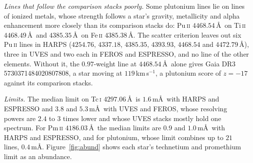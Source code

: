 \documentclass[3p,11pt]{elsarticle}
\newcommand{\kms}{km\,s$^{-1}$}
\newcommand{\ion}[2]{#1\,\textsc{#2}}
\begin{document}
\emph{Lines that follow the comparison stacks poorly.} Some plutonium lines lie on lines
of ionized metals, whose strength follows a star's gravity, metallicity and alpha
enhancement more closely than its comparison stacks do: \ion{Pu}{ii} $4468.54$\,\AA\ on
\ion{Ti}{ii} $4468.49$\,\AA\ and $4385.35$\,\AA\ on \ion{Fe}{ii} $4385.38$\,\AA. The
scatter criterion leaves out six \ion{Pu}{ii} lines in HARPS ($4254.76$, $4337.18$,
$4385.35$, $4393.93$, $4468.54$ and $4472.79$\,\AA), three in UVES and two each in
FEROS and ESPRESSO, and no line of the other elements. Without it, the $0.97$-weight
line at $4468.54$\,\AA\ alone gives Gaia DR3 5730371484020807808, a star moving at
$119$\,\kms, a plutonium score of $z=-17$ against its comparison stacks.

\emph{Limits.} The median limit on \ion{Tc}{i} $4297.06$\,\AA\ is $1.6$\,m\AA\ with
HARPS and ESPRESSO and $3.8$ and $5.3$\,m\AA\ with UVES and FEROS, whose resolving
powers are $2.4$ to $3$ times lower and whose UVES stacks mostly hold one spectrum. For
\ion{Pm}{ii} $4186.03$\,\AA\ the median limits are $0.9$ and $1.0$\,m\AA\ with HARPS and
ESPRESSO, and for plutonium, whose limit combines up to $21$ lines, $0.4$\,m\AA.
Figure~\ref{fig:abund} shows each star's technetium and promethium limit as an
abundance.
\end{document}
